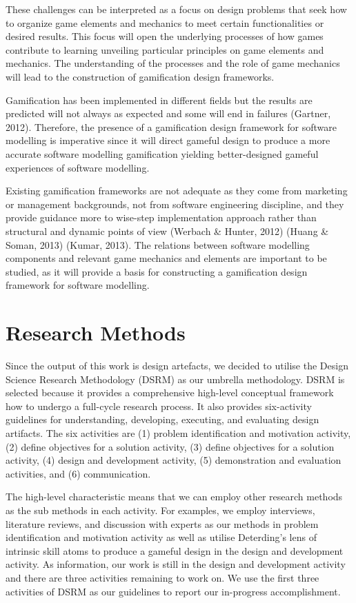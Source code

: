 \documentclass[runningheads,a4paper]{llncs}
\begin{document}
These challenges can be interpreted as a focus on design problems that seek how to organize game elements and mechanics to meet certain functionalities or desired results. This focus will open the underlying processes of how games contribute to learning unveiling particular principles on game elements and mechanics. The understanding of the processes and the role of game mechanics will lead to the construction of gamification design frameworks. 

Gamification has been implemented in different fields but the results are predicted will not always as expected and some will end in failures (Gartner, 2012). Therefore, the presence of a gamification design framework for software modelling is imperative since it will direct gameful design to produce a more accurate software modelling gamification yielding better-designed gameful experiences of software modelling. 

Existing gamification frameworks are not adequate as they come from marketing or management backgrounds, not from software engineering discipline, and they provide guidance more to wise-step implementation approach rather than structural and dynamic points of view (Werbach \& Hunter, 2012) (Huang \& Soman, 2013) (Kumar, 2013). The relations between software modelling components and relevant game mechanics and elements are important to be studied, as it will provide a basis for constructing a gamification design framework for software modelling.

\section{Research Methods}
Since the output of this work is design artefacts, we decided to utilise the Design Science Research Methodology (DSRM) \cite{peffers2007design} as our umbrella methodology. DSRM is selected because it provides a comprehensive high-level conceptual framework how to undergo a full-cycle research process. It also provides six-activity guidelines for understanding, developing, executing, and evaluating design artifacts. The six activities are (1) problem identification and motivation activity, (2) define objectives for a solution activity, (3) define objectives for a solution activity, (4) design and development activity, (5) demonstration and evaluation activities, and (6) communication. 

The high-level characteristic means that we can employ other research methods as the sub methods in each activity. For examples, we employ interviews, literature reviews, and discussion with experts as our methods in problem identification and motivation activity as well as utilise Deterding's lens of intrinsic skill atoms \cite{deterding2015lens} to produce a gameful design in the design and development activity. As information, our work is still in the design and development activity and there are three activities remaining to work on. We use the first three activities of DSRM as our guidelines to report our in-progress accomplishment.
 
\end{document}
